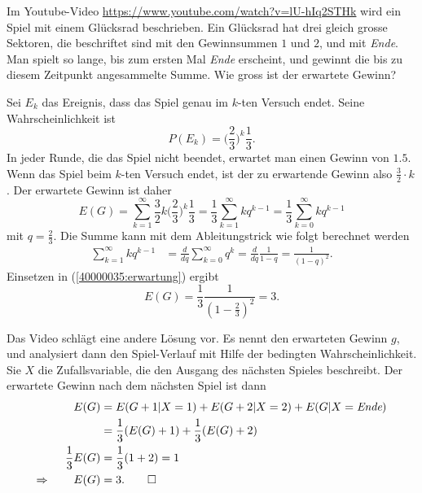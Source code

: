 Im Youtube-Video
\url{https://www.youtube.com/watch?v=lU-hIq2STHk}
wird ein Spiel mit einem Glücksrad beschrieben.
Ein Glücksrad hat drei gleich grosse Sektoren, die beschriftet sind mit
den Gewinnsummen $1$ und $2$, und mit {\em Ende}.
Man spielt so lange, bis zum ersten Mal {\em Ende} erscheint, und gewinnt 
die bis zu diesem Zeitpunkt angesammelte Summe.
Wie gross ist der erwartete Gewinn?


\begin{loesung}
Sei $E_k$ das Ereignis, dass das Spiel genau im $k$-ten Versuch endet.
Seine Wahrscheinlichkeit ist
\[
P(E_k)=\biggl(\frac23\biggr)^k\frac13.
\]
In jeder Runde, die das Spiel nicht beendet, erwartet man einen Gewinn von $1.5$.
Wenn das Spiel beim $k$-ten Versuch endet, ist der zu erwartende Gewinn also
$\frac32\cdot k$.
Der erwartete Gewinn ist daher
\begin{equation}
E(G)
=
\sum_{k=1}^\infty \frac32k\biggl(\frac23\biggr)^k\frac13
=
\frac13\sum_{k=1}^\infty kq^{k-1}
=
\frac13\sum_{k=0}^\infty kq^{k-1}
\label{40000035:erwartung}
\end{equation}
mit $q=\frac23$.
Die Summe kann mit dem Ableitungstrick wie folgt berechnet werden
\begin{align*}
\sum_{k=1}^\infty kq^{k-1}
&=
\frac{d}{dq} \sum_{k=0}^\infty q^k
=
\frac{d}{dq} \frac{1}{1-q}
=
\frac1{(1-q)^2}.
\end{align*}
Einsetzen in (\ref{40000035:erwartung}) ergibt
\[
E(G)=\frac13\frac1{(1-\frac23)^2}=3.
\]

Das Video schlägt eine andere Lösung vor.  
Es nennt den erwarteten Gewinn $g$, und analysiert dann den Spiel-Verlauf mit
Hilfe der bedingten Wahrscheinlichkeit.
Sie $X$ die Zufallsvariable, die den Ausgang des nächsten Spieles beschreibt.
Der erwartete Gewinn nach dem nächsten Spiel ist dann
\begin{align*}
E(G)
&=
E(G+1|X=1)+E(G+2|X=2)+E(G|X=\text{\em Ende})
\\
&=
\frac13(E(G)+1) + \frac13(E(G)+2)
\\
\frac13E(G)
&=\frac13(1+2)=1
\\
\Rightarrow\qquad E(G)&=3.
\qedhere
\end{align*}
\end{loesung}

